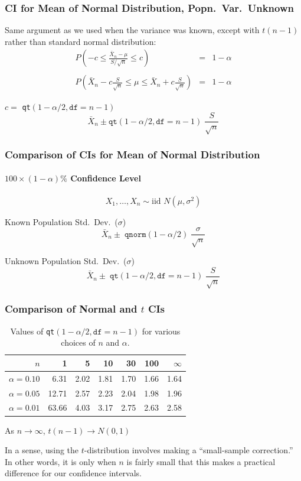 \begin{frame}
\frametitle{CI for Mean of Normal Distribution, Popn.\ Var.\ Unknown}
Same argument as we used when the variance was known, except with $t(n-1)$ rather than standard normal distribution:
	\begin{eqnarray*}
		P\left(-c \leq \frac{\bar{X}_n-\mu}{S/\sqrt{n}} \leq c \right) &=& 1-\alpha \\ \\ 
		P\left(\bar{X}_n - c \frac{S}{\sqrt{n}} \leq \mu\leq \bar{X}_n +c \frac{S}{\sqrt{n}} \right) &=& 1-\alpha 
	\end{eqnarray*}

\alert{$c =$ \texttt{qt}$(1-\alpha/2, \texttt{df} = n-1)$} 
	$$\boxed{\bar{X}_n \pm \texttt{qt}(1-\alpha/2, \texttt{df} = n-1)\;  \frac{S}{\sqrt{n}}}$$
\end{frame}



\begin{frame}
\frametitle{Comparison of CIs for Mean of Normal Distribution}
\framesubtitle{$100\times(1-\alpha)\%$ Confidence Level}
$$\boxed{X_1, \hdots, X_n \sim \mbox{iid } N(\mu, \sigma^2)}$$


\begin{block}{Known Population Std.\ Dev.\ ($\sigma$)}
	$$\bar{X}_n \pm \; \texttt{qnorm}(1-\alpha/2) \; \frac{\sigma}{\sqrt{n}}$$
\end{block}


\begin{block}{Unknown Population Std.\ Dev.\ ($\sigma$)}
$$\bar{X}_n \pm \; \texttt{qt}(1-\alpha/2, \texttt{df} = n-1) \; \frac{S}{\sqrt{n}}$$
\end{block}
\end{frame}
\begin{frame}
\frametitle{Comparison of Normal and $t$ CIs}
\begin{table}
\caption{Values of \texttt{qt}$(1-\alpha/2, \texttt{df}=n-1)$ for various choices of $n$ and $\alpha$. }
\begin{tabular}{r|rrrrr|r}
\hline
$n$& 1& 5& 10& 30& 100 & $\infty$\\
\hline
$\alpha = 0.10$&  6.31& 2.02 & 1.81 & 1.70  & 1.66 &1.64\\
$\alpha = 0.05$ & 12.71& 2.57 & 2.23 & 2.04  & 1.98 &1.96\\
$\alpha = 0.01$ & 63.66& 4.03 & 3.17 & 2.75  & 2.63 &2.58\\
\hline
\end{tabular}
\end{table}
\alert{As $n\rightarrow \infty$, $t(n-1) \rightarrow N(0,1)$}
\vspace{1em}


In a sense, using the $t$-distribution involves making a ``small-sample correction.'' In other words, it is only when $n$ is fairly small that this makes a practical difference for our confidence intervals.
\end{frame}

